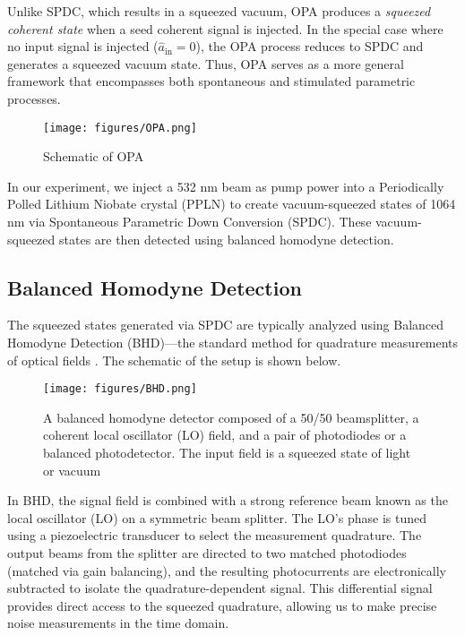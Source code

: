 \documentclass[colorlinks=true,pdfstartview=FitV,linkcolor=blue,
citecolor=red,urlcolor=magenta]{ligodoc}
\begin{document}
Unlike SPDC, which results in a squeezed vacuum, OPA produces a \textit{squeezed coherent state} when a seed coherent signal is injected. In the special case where no input signal is injected ($\hat{a}_\text{in} = 0$), the OPA process reduces to SPDC and generates a squeezed vacuum state. Thus, OPA serves as a more general framework that encompasses both spontaneous and stimulated parametric processes.\\

\begin{figure}[H]
    \centering
    \texttt{[image: figures/OPA.png]}
   \caption{  Schematic of OPA \cite{mckenzie}}
    \label{fig:enter-label}
\end{figure}

In our experiment, we inject a 532 nm beam as pump power into a Periodically Polled Lithium Niobate crystal (PPLN) to create vacuum-squeezed states of 1064 nm via Spontaneous Parametric Down Conversion (SPDC).  These vacuum-squeezed states are then detected using balanced homodyne detection.  
\subsection{Balanced Homodyne Detection}
The squeezed states generated via SPDC are typically analyzed using Balanced Homodyne Detection (BHD)—the standard method for quadrature measurements of optical fields \cite{goda}. The schematic of the setup is shown below.
\begin{figure}[H]
    \centering
    \texttt{[image: figures/BHD.png]}
   \caption{  A balanced homodyne detector composed of a 50/50 beamsplitter, a coherent local
oscillator (LO) field, and a pair of photodiodes or a balanced photodetector. The input field is a
squeezed state of light or vacuum\cite{goda}}
    \label{fig:enter-label}
\end{figure}

In BHD, the signal field is combined with a strong reference beam known as the local oscillator (LO) on a symmetric beam splitter. The LO’s phase is tuned using a piezoelectric transducer to select the measurement quadrature. The output beams from the splitter are directed to two matched photodiodes (matched via gain balancing), and the resulting photocurrents are electronically subtracted to isolate the quadrature-dependent signal. This differential signal provides direct access to the squeezed quadrature, allowing us to make precise noise measurements in the  time domain. \\
\end{document}
